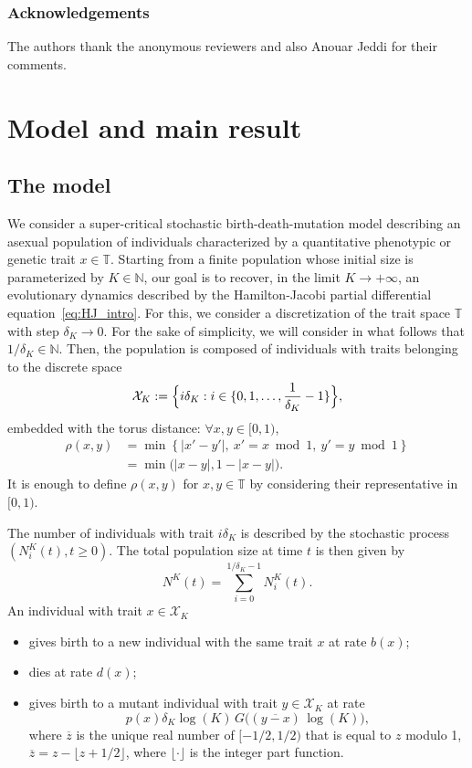 \documentclass[10pt]{amsart}
\let\cal\mathcal
\theoremstyle{plain}
\theoremstyle{remark}
\newcommand\T{\mathbb{T}}
\newcommand\N{\mathbb{N}}
\begin{document}
\subsubsection*{Acknowledgements}
The authors thank the anonymous reviewers and also Anouar Jeddi for their comments.

\section{Model and main result}
\label{sec:model-main-result}
\subsection{The model}

We consider a super-critical stochastic birth-death-mutation model describing an asexual population of individuals characterized by a quantitative phenotypic or genetic trait $x\in \T$. Starting from a finite population whose initial size is parameterized by $K\in \N$, our goal is to recover, in the limit $K\to +\infty$, an evolutionary dynamics described by the Hamilton-Jacobi partial differential equation~\eqref{eq:HJ_intro}. For this, we consider a discretization of the trait space $\T$ with step $\delta_K\to 0$. For the sake of simplicity, we will consider in what follows that $1/\delta_K\in \N$. Then, the population is composed of individuals with traits belonging to the discrete space
\[
{\cal X}_K:=\Bigl\{i\delta_K:i\in \{0, 1,\dots, \frac{1}{\delta_K}-1\}\Bigr\},
\]
embedded with the torus distance: $\forall x, y \in [0,1)$,
\begin{align*}
\rho(x,y) & =\min\left\{|x'-y'|,\ x'=x\bmod1,\ y'=y\bmod1\right\} \\ & =\min\big(|x-y|,1-|x-y|\big).\end{align*}
It is enough to define $\rho(x,y)$ for $x,y \in \T$ by considering their representative in $[0,1)$.

The number of individuals with trait $i \delta_K$ is described by the stochastic process $(N_i^K(t), t\ge 0)$. The total population size at time $t$ is then given by
\[
N^K(t)=\sum_{i=0}^{1/\delta_K-1}N_i^K(t).
\]
An individual with trait $x\in {\cal X}_K$
\begin{itemize}
\item gives birth to a new individual with the same trait $x$ at rate $b(x)$;

\item dies at rate $d(x)$;

\item gives birth to a mutant individual with trait $y\in{\cal X}_K$ at rate
\begin{equation}\label{mutation-rate}
p(x)\delta_K \log(K)\, G\bigl((\overline{y-x})\,\log(K)\bigr),
\end{equation}
where
$\overline{z}$ is the unique real number of $[-1/2,1/2)$ that is equal to $z$ modulo 1, \ie $\overline{z}=z-\lfloor z+1/2\rfloor$, where $\lfloor\cdot\rfloor$ is the integer part function.
\end{itemize}
\end{document}
